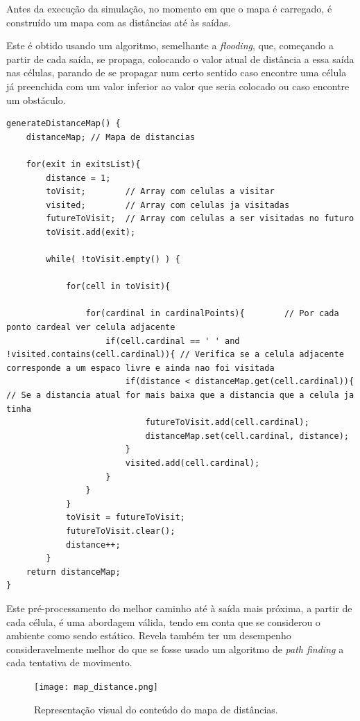 \documentclass[12pt]{article}
\begin{document}
\begin{titlepage}
\begin{itemize}
\begin{itemize}
Antes da execução da simulação, no momento em que o mapa é carregado, é construído um mapa com as distâncias até às saídas. 

Este é obtido usando um algoritmo, semelhante a \textit{flooding}, que, começando a partir de cada saída, se propaga, colocando o valor atual de distância a essa saída nas células, parando de se propagar num certo sentido caso encontre uma célula já preenchida com um valor inferior ao valor que seria colocado ou caso encontre um obstáculo.

\begin{lstlisting}[caption= Pseudo-código do algoritmo usado para o preenchimento do mapa de distâncias.]
generateDistanceMap() {
	distanceMap; // Mapa de distancias

	for(exit in exitsList){
		distance = 1;
		toVisit; 		// Array com celulas a visitar
		visited; 		// Array com celulas ja visitadas
		futureToVisit; 	// Array com celulas a ser visitadas no futuro
		toVisit.add(exit);

		while( !toVisit.empty() ) {

			for(cell in toVisit){
				
				for(cardinal in cardinalPoints){		// Por cada ponto cardeal ver celula adjacente
					if(cell.cardinal == ' ' and !visited.contains(cell.cardinal)){ // Verifica se a celula adjacente corresponde a um espaco livre e ainda nao foi visitada
						if(distance < distanceMap.get(cell.cardinal)){ // Se a distancia atual for mais baixa que a distancia que a celula ja tinha
							futureToVisit.add(cell.cardinal);
							distanceMap.set(cell.cardinal, distance);
						}
						visited.add(cell.cardinal);
					}
				}
			}
			toVisit = futureToVisit;
			futureToVisit.clear();
			distance++;
		}
	return distanceMap;		
}
\end{lstlisting}

Este pré-processamento do melhor caminho até à saída mais próxima, a partir de cada célula, é uma abordagem válida, tendo em conta que se considerou o ambiente como sendo estático. Revela também ter um desempenho consideravelmente melhor do que se fosse usado um algoritmo de \textit{path finding} a cada tentativa de movimento. 

\begin{figure}[H]
	\centering
	\texttt{[image: map\_distance.png]}
	\caption{Representação visual do conteúdo do mapa de distâncias\protect\footnotemark.}
	\label{map}
\end{figure}



\end{itemize}
\end{itemize}
\end{titlepage}
\end{document}

